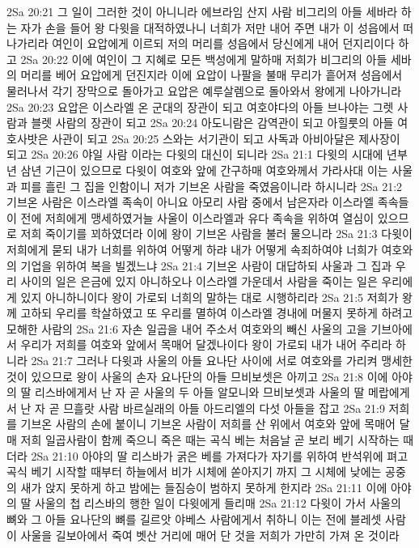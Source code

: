 2Sa 20:21  그 일이 그러한 것이 아니니라 에브라임 산지 사람 비그리의 아들 세바라 하는 자가 손을 들어 왕 다윗을 대적하였나니 너희가 저만 내어 주면 내가 이 성읍에서 떠나가리라 여인이 요압에게 이르되 저의 머리를 성읍에서 당신에게 내어 던지리이다 하고
2Sa 20:22  이에 여인이 그 지혜로 모든 백성에게 말하매 저희가 비그리의 아들 세바의 머리를 베어 요압에게 던진지라 이에 요압이 나팔을 불매 무리가 흩어져 성읍에서 물러나서 각기 장막으로 돌아가고 요압은 예루살렘으로 돌아와서 왕에게 나아가니라
2Sa 20:23  요압은 이스라엘 온 군대의 장관이 되고 여호야다의 아들 브나야는 그렛 사람과 블렛 사람의 장관이 되고
2Sa 20:24  아도니람은 감역관이 되고 아힐룻의 아들 여호사밧은 사관이 되고
2Sa 20:25  스와는 서기관이 되고 사독과 아비아달은 제사장이 되고
2Sa 20:26  야일 사람 이라는 다윗의 대신이 되니라
2Sa 21:1  다윗의 시대에 년부년 삼년 기근이 있으므로 다윗이 여호와 앞에 간구하매 여호와께서 가라사대 이는 사울과 피를 흘린 그 집을 인함이니 저가 기브온 사람을 죽였음이니라 하시니라
2Sa 21:2  기브온 사람은 이스라엘 족속이 아니요 아모리 사람 중에서 남은자라 이스라엘 족속들이 전에 저희에게 맹세하였거늘 사울이 이스라엘과 유다 족속을 위하여 열심이 있으므로 저희 죽이기를 꾀하였더라 이에 왕이 기브온 사람을 불러 물으니라
2Sa 21:3  다윗이 저희에게 묻되 내가 너희를 위하여 어떻게 하랴 내가 어떻게 속죄하여야 너희가 여호와의 기업을 위하여 복을 빌겠느냐
2Sa 21:4  기브온 사람이 대답하되 사울과 그 집과 우리 사이의 일은 은금에 있지 아니하오나 이스라엘 가운데서 사람을 죽이는 일은 우리에게 있지 아니하니이다 왕이 가로되 너희의 말하는 대로 시행하리라
2Sa 21:5  저희가 왕께 고하되 우리를 학살하였고 또 우리를 멸하여 이스라엘 경내에 머물지 못하게 하려고 모해한 사람의
2Sa 21:6  자손 일곱을 내어 주소서 여호와의 빼신 사울의 고을 기브아에서 우리가 저희를 여호와 앞에서 목매어 달겠나이다 왕이 가로되 내가 내어 주리라 하니라
2Sa 21:7  그러나 다윗과 사울의 아들 요나단 사이에 서로 여호와를 가리켜 맹세한 것이 있으므로 왕이 사울의 손자 요나단의 아들 므비보셋은 아끼고
2Sa 21:8  이에 아야의 딸 리스바에게서 난 자 곧 사울의 두 아들 알모니와 므비보셋과 사울의 딸 메랍에게서 난 자 곧 므흘랏 사람 바르실래의 아들 아드리엘의 다섯 아들을 잡고
2Sa 21:9  저희를 기브온 사람의 손에 붙이니 기브온 사람이 저희를 산 위에서 여호와 앞에 목매어 달매 저희 일곱사람이 함께 죽으니 죽은 때는 곡식 베는 처음날 곧 보리 베기 시작하는 때더라
2Sa 21:10  아야의 딸 리스바가 굵은 베를 가져다가 자기를 위하여 반석위에 펴고 곡식 베기 시작할 때부터 하늘에서 비가 시체에 쏟아지기 까지 그 시체에 낮에는 공중의 새가 앉지 못하게 하고 밤에는 들짐승이 범하지 못하게 한지라
2Sa 21:11  이에 아야의 딸 사울의 첩 리스바의 행한 일이 다윗에게 들리매
2Sa 21:12  다윗이 가서 사울의 뼈와 그 아들 요나단의 뼈를 길르앗 야베스 사람에게서 취하니 이는 전에 블레셋 사람이 사울을 길보아에서 죽여 벳산 거리에 매어 단 것을 저희가 가만히 가져 온 것이라

